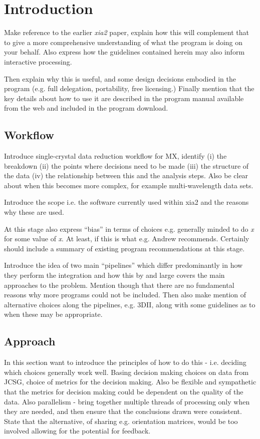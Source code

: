 \documentclass[a4paper,11pt]{article}
\begin{document}
\section{Introduction}

Make reference to the earlier \emph{xia2} paper, explain how this will
complement that to give a more comprehensive understanding of what the
program is doing on your behalf. Also express how the guidelines
contained herein may also inform interactive processing.

Then explain why this is useful, and some design decisions embodied in
the program (e.g. full delegation, portability, free licensing.)
Finally mention that the key details about how to use it are described
in the program manual available from the web and included in the
program download.

\subsection{Workflow}

Introduce single-crystal data reduction workflow for MX, identify (i)
the breakdown (ii) the points where decisions need to be made (iii)
the structure of the data (iv) the relationship between this and the
analysis steps. Also be clear about when this becomes more complex,
for example multi-wavelength data sets.

Introduce the scope i.e. the software currently used within xia2 and
the reasons why these are used.

At this stage also express ``bias'' in terms of choices e.g. generally
minded to do \emph{x} for some value of \emph{x}. At least, if this is
what e.g. Andrew recommends. Certainly should include a summary of
existing program recommendations at this stage.

Introduce the idea of two main ``pipelines'' which differ
predominantly in how they perform the integration and how this by and
large covers the main approaches to the problem. Mention though that
there are no fundamental reasons why more programs could not be
included. Then also make mention of alternative choices along the
pipelines, e.g. 3DII, along with some guidelines as to when these may
be appropriate.

\subsection{Approach}

In this section want to introduce the principles of how to do this -
i.e. deciding which choices generally work well. Basing decision
making choices on data from JCSG, choice of metrics for the decision
making. Also be flexible and sympathetic that the metrics for decision
making could be dependent on the quality of the data. Also parallelism
- bring together multiple threads of processing only when they are
needed, and then ensure that the conclusions drawn were
consistent. State that the alternative, of sharing e.g. orientation
matrices, would be too involved allowing for the potential for feedback.
\end{document}
